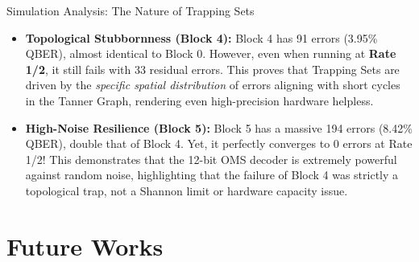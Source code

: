 \documentclass[t, aspectratio=169]{beamer}
\begin{document}
	\begin{frame}{Simulation Analysis: The Nature of Trapping Sets}
        \begin{itemize}
            
            \vspace{0.8em}
            \item \textbf{Topological Stubbornness (Block 4):} 
            Block 4 has 91 errors (3.95\% QBER), almost identical to Block 0. However, even when running at \textbf{Rate 1/2}, it still fails with 33 residual errors. This proves that Trapping Sets are driven by the \textit{specific spatial distribution} of errors aligning with short cycles in the Tanner Graph, rendering even high-precision hardware helpless.

            \vspace{0.8em}
            \item \textbf{High-Noise Resilience (Block 5):} 
            Block 5 has a massive 194 errors (8.42\% QBER), double that of Block 4. Yet, it perfectly converges to 0 errors at Rate 1/2! This demonstrates that the 12-bit OMS decoder is extremely powerful against random noise, highlighting that the failure of Block 4 was strictly a topological trap, not a Shannon limit or hardware capacity issue.
        \end{itemize}
	\end{frame}

	\section{Future Works}
	\useStyleLogoOnly 
	\useThickBar 
\end{document}
